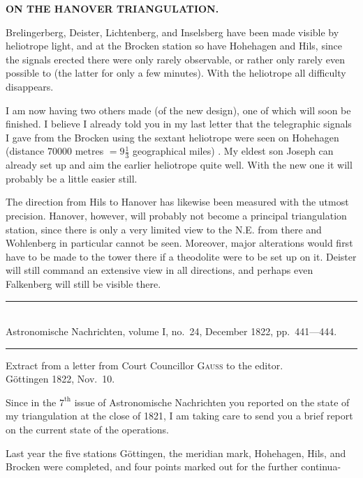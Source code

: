 \par\clearpage
\noindent\null\hfill{\small\textbf{ON THE HANOVER TRIANGULATION.}}\hfill{}\par\medskip
\par\noindent\hspace*{\parindent}Brelingerberg, Deister, Lichtenberg, and Inselsberg have been made visible by heliotrope light, and at the Brocken station so have Hohehagen and Hils, since the signals erected there were only rarely observable, or rather only rarely even possible to  (the latter for only a few minutes). With the heliotrope all difficulty disappears.
\par\noindent\hspace*{\parindent}I am now having two others made (of the new design), one of which will soon be finished. I believe I already told you in my last letter that the telegraphic signals I gave from the Brocken using the sextant heliotrope were seen on Hohehagen (distance \(70000\) metres \(=9\frac{1}{3}\) geographical miles) . My eldest son Joseph can already set up and aim the earlier heliotrope quite well. With the new one it will probably be a little easier still.
\par\noindent\hspace*{\parindent}The direction from Hils to Hanover has likewise been measured with the utmost precision. Hanover, however, will probably not become a principal triangulation station, since there is only a very limited view to the N.E. from there and Wohlenberg in particular cannot be seen. Moreover, major alterations would first have to be made to the tower there if a theodolite were to be set up on it. Deister will still command an extensive view in all directions, and perhaps even Falkenberg will still be visible there.
\begin{center}
\rule{.74\linewidth}{.4pt}\\[-.5ex]
{\small Astronomische Nachrichten, volume I, no.~24, December 1822, pp.~441---444.}\\[-.5ex]
\rule{.74\linewidth}{.4pt}\par\medskip
Extract from a letter from Court Councillor \textsc{Gauss} to the editor.\\
Göttingen 1822, Nov.~10.
\end{center}
\par\noindent\hspace*{\parindent}Since in the \(7^{\text{th}}\) issue of Astronomische Nachrichten you reported on the state of my triangulation at the close of 1821, I am taking care to send you a brief report on the current state of the operations.
\par\noindent\hspace*{\parindent}Last year the five stations Göttingen, the meridian mark, Hohehagen, Hils, and Brocken were completed, and four points marked out for the further continua-

